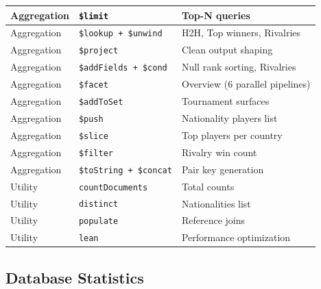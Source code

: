 \documentclass[12pt,a4paper]{article}
\begin{document}
\begin{longtable}{|l|l|p{5cm}|}
    \hline
    Aggregation & \texttt{\$limit}                         & Top-N queries \\
    \hline
    Aggregation & \texttt{\$lookup + \$unwind}             & H2H, Top winners, Rivalries \\
    \hline
    Aggregation & \texttt{\$project}                       & Clean output shaping \\
    \hline
    Aggregation & \texttt{\$addFields + \$cond}             & Null rank sorting, Rivalries \\
    \hline
    Aggregation & \texttt{\$facet}                         & Overview (6 parallel pipelines) \\
    \hline
    Aggregation & \texttt{\$addToSet}                      & Tournament surfaces \\
    \hline
    Aggregation & \texttt{\$push}                          & Nationality players list \\
    \hline
    Aggregation & \texttt{\$slice}                         & Top players per country \\
    \hline
    Aggregation & \texttt{\$filter}                        & Rivalry win count \\
    \hline
    Aggregation & \texttt{\$toString + \$concat}             & Pair key generation \\
    \hline
    Utility     & \texttt{countDocuments}                   & Total counts \\
    \hline
    Utility     & \texttt{distinct}                        & Nationalities list \\
    \hline
    Utility     & \texttt{populate}                        & Reference joins \\
    \hline
    Utility     & \texttt{lean}                            & Performance optimization \\
    \hline
\end{longtable}

\subsection{Database Statistics}
\end{document}

